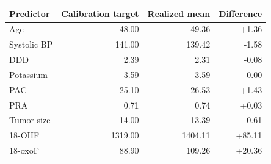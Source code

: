 \begin{tabular}{lrrr}
\toprule
Predictor & Calibration target & Realized mean & Difference \\
\midrule
Age & 48.00 & 49.36 & +1.36 \\
Systolic BP & 141.00 & 139.42 & -1.58 \\
DDD & 2.39 & 2.31 & -0.08 \\
Potassium & 3.59 & 3.59 & -0.00 \\
PAC & 25.10 & 26.53 & +1.43 \\
PRA & 0.71 & 0.74 & +0.03 \\
Tumor size & 14.00 & 13.39 & -0.61 \\
18-OHF & 1319.00 & 1404.11 & +85.11 \\
18-oxoF & 88.90 & 109.26 & +20.36 \\
\bottomrule
\end{tabular}
